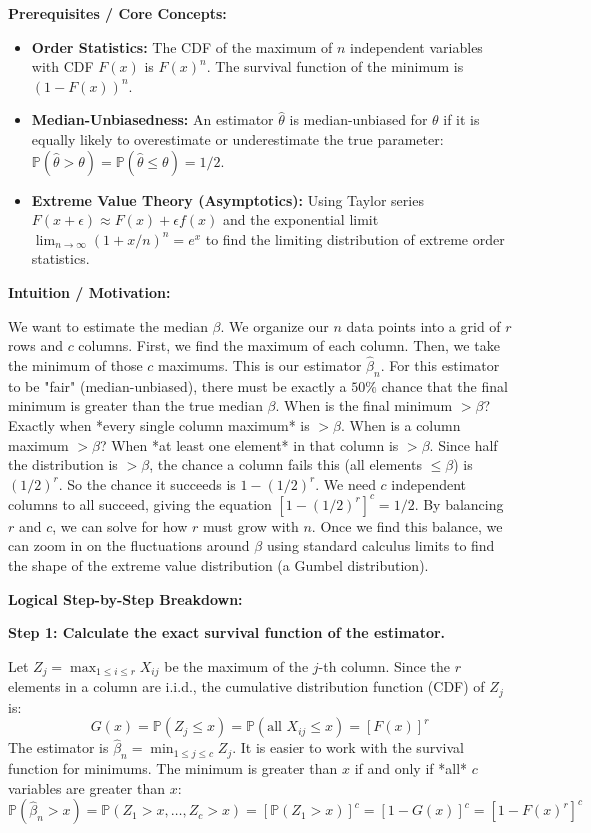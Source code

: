 \begin{solution}
\textbf{Prerequisites / Core Concepts:}
\begin{itemize}
    \item \textbf{Order Statistics:} The CDF of the maximum of $n$ independent variables with CDF $F(x)$ is $F(x)^n$. The survival function of the minimum is $(1-F(x))^n$.
    \item \textbf{Median-Unbiasedness:} An estimator $\hat{\theta}$ is median-unbiased for $\theta$ if it is equally likely to overestimate or underestimate the true parameter: $\mathbb{P}(\hat{\theta} > \theta) = \mathbb{P}(\hat{\theta} \leq \theta) = 1/2$.
    \item \textbf{Extreme Value Theory (Asymptotics):} Using Taylor series $F(x+\epsilon) \approx F(x) + \epsilon f(x)$ and the exponential limit $\lim_{n \to \infty} (1 + x/n)^n = e^x$ to find the limiting distribution of extreme order statistics.
\end{itemize}

\textbf{Intuition / Motivation:}

We want to estimate the median $\beta$. We organize our $n$ data points into a grid of $r$ rows and $c$ columns.
First, we find the maximum of each column. Then, we take the minimum of those $c$ maximums. This is our estimator $\hat{\beta}_n$.
For this estimator to be "fair" (median-unbiased), there must be exactly a $50\%$ chance that the final minimum is greater than the true median $\beta$.
When is the final minimum $> \beta$? Exactly when *every single column maximum* is $> \beta$.
When is a column maximum $> \beta$? When *at least one element* in that column is $> \beta$. Since half the distribution is $> \beta$, the chance a column fails this (all elements $\leq \beta$) is $(1/2)^r$. So the chance it succeeds is $1 - (1/2)^r$.
We need $c$ independent columns to all succeed, giving the equation $[1 - (1/2)^r]^c = 1/2$.
By balancing $r$ and $c$, we can solve for how $r$ must grow with $n$. Once we find this balance, we can zoom in on the fluctuations around $\beta$ using standard calculus limits to find the shape of the extreme value distribution (a Gumbel distribution).

\textbf{Logical Step-by-Step Breakdown:}

\textbf{Step 1: Calculate the exact survival function of the estimator.}

Let $Z_j = \max_{1 \leq i \leq r} X_{ij}$ be the maximum of the $j$-th column.
Since the $r$ elements in a column are i.i.d., the cumulative distribution function (CDF) of $Z_j$ is:
\[ G(x) = \mathbb{P}(Z_j \leq x) = \mathbb{P}(\text{all } X_{ij} \leq x) = [F(x)]^r \]
The estimator is $\hat{\beta}_n = \min_{1 \leq j \leq c} Z_j$.
It is easier to work with the survival function for minimums. The minimum is greater than $x$ if and only if *all* $c$ variables are greater than $x$:
\[ \mathbb{P}(\hat{\beta}_n > x) = \mathbb{P}(Z_1 > x, \dots, Z_c > x) = [\mathbb{P}(Z_1 > x)]^c = [1 - G(x)]^c = [1 - F(x)^r]^c \]


\end{solution}
